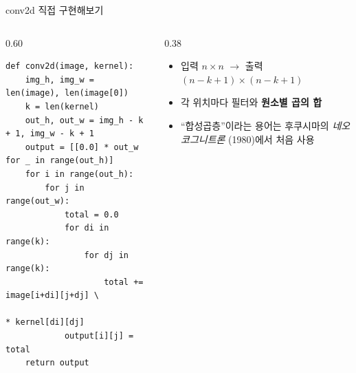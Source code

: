 \begin{frame}[fragile]{conv2d 직접 구현해보기}
  \begin{columns}[T]
    \begin{column}{0.60\textwidth}
\begin{lstlisting}
def conv2d(image, kernel):
    img_h, img_w = len(image), len(image[0])
    k = len(kernel)
    out_h, out_w = img_h - k + 1, img_w - k + 1
    output = [[0.0] * out_w for _ in range(out_h)]
    for i in range(out_h):
        for j in range(out_w):
            total = 0.0
            for di in range(k):
                for dj in range(k):
                    total += image[i+di][j+dj] \
                             * kernel[di][dj]
            output[i][j] = total
    return output
\end{lstlisting}
    \end{column}
    \begin{column}{0.38\textwidth}
      \begin{itemize}
        \item 입력 $n\times n$ $\to$ 출력
          $(n-k+1)\times(n-k+1)$
        \item 각 위치마다 필터와
          \textbf{원소별 곱의 합}
        \item ``합성곱층''이라는 용어는
          후쿠시마의 \textit{네오코그니트론}
          (1980)에서 처음 사용
      \end{itemize}
    \end{column}
  \end{columns}
\end{frame}

